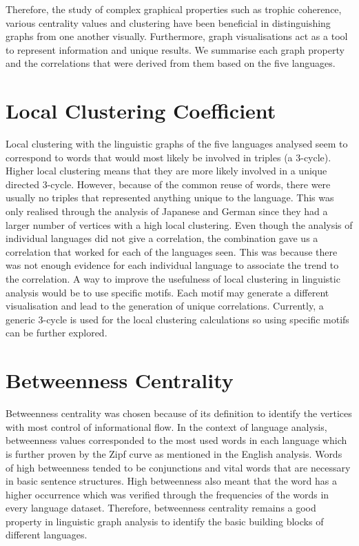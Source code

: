 Therefore, the study of complex graphical properties such as trophic coherence, various centrality values and clustering have been beneficial in distinguishing graphs from one another visually. Furthermore, graph visualisations act as a tool to represent information and unique results. We summarise each graph property and the correlations that were derived from them based on the five languages.

\section{Local Clustering Coefficient}
Local clustering with the linguistic graphs of the five languages analysed seem to correspond to words that would most likely be involved in triples (a 3-cycle). Higher local clustering means that they are more likely involved in a unique directed 3-cycle. However, because of the common reuse of words, there were usually no triples that represented anything unique to the language. This was only realised through the analysis of Japanese and German since they had a larger number of vertices with a high local clustering. Even though the analysis of individual languages did not give a correlation, the combination gave us a correlation that worked for each of the languages seen. This was because there was not enough evidence for each individual language to associate the trend to the correlation. A way to improve the usefulness of local clustering in linguistic analysis would be to use specific motifs. Each motif may generate a different visualisation and lead to the generation of unique correlations. Currently, a generic 3-cycle is used for the local clustering calculations so using specific motifs can be further explored.

\section{Betweenness Centrality}
Betweenness centrality was chosen because of its definition to identify the vertices with most control of informational flow. In the context of language analysis, betweenness values corresponded to the most used words in each language which is further proven by the Zipf curve as mentioned in the English analysis. Words of high betweenness tended to be conjunctions and vital words that are necessary in basic sentence structures. High betweenness also meant that the word has a higher occurrence which was verified through the frequencies of the words in every language dataset. Therefore, betweenness centrality remains a good property in linguistic graph analysis to identify the basic building blocks of different languages.

